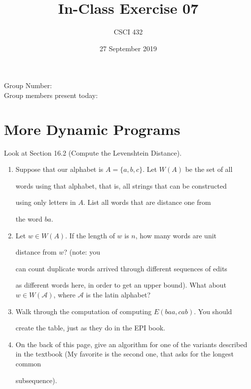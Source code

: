 \documentclass{article}
\title{In-Class Exercise 07}
\author{CSCI 432}
\date{27 September 2019}
\begin{document}
\maketitle



\noindent

Group Number:\\

Group members present today:



\section*{More Dynamic Programs}

Look at Section 16.2 (Compute the Levenshtein Distance).



\begin{enumerate}

    \item Suppose that our alphabet is $A=\{a,b,c\}$.  Let $W(A)$ be the set of all

        words using that alphabet, that is, all strings that can be constructed

        using only letters in $A$.  List all words that are distance one from

        the word $ba$.

        \vspace{1in}

    \item Let $w \in W(A)$.  If the length of $w$ is $n$, how many words are unit

        distance from $w$? (note: you

        can count duplicate words arrived through different sequences of edits

        as different words here, in order to get an upper bound).  What about $w

        \in W(\mathcal{A})$, where $\mathcal{A}$ is the latin alphabet?

        \vspace{1in}

    \item Walk through the computation of computing $E(baa,cab)$.  You should

        create the table, just as they do in the EPI book.

        \vspace{2in}

    \item On the back of this page, give an algorithm for one of the variants described in the textbook
        (My favorite is the second one, that asks for the longest common

        subsequence).

\end{enumerate}
\end{document}
